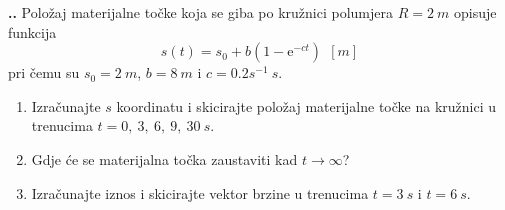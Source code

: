 

\noindent 
\textbf{
\thecjelina.\thezadatak.}
Položaj materijalne točke koja se giba po kružnici polumjera $R=2\ m $ opisuje funkcija
$$
s(t)= s_0 + b(1-\mathrm{e}^{-ct}) \ \ [m]
$$
pri čemu su $s_0=2\ m$, $b=8\ m$ i $c=0.2s^{-1}\ s$.
\begin{enumerate}[label=\alph*)]
 \item Izračunajte $s$ koordinatu i skicirajte položaj materijalne točke na kružnici u trenucima $t=0,\ 3,\ 6,\ 9,\ 30\ s$.
 \item Gdje će se materijalna točka zaustaviti kad $t\rightarrow \infty$?
 \item Izračunajte iznos i skicirajte vektor brzine u trenucima $t=3\ s$ i $t=6\ s$. 
\end{enumerate}
